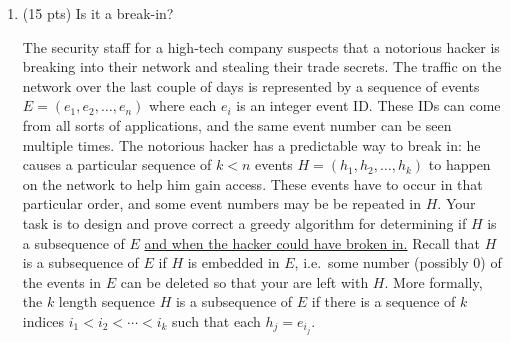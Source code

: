 \documentclass[11pt]{article}
\theoremstyle{definition}
\newtheorem*{algo}{Algorithm}
\newtheorem*{proofcorr}{Proof of correctness}
\newtheorem*{analysis}{Big-O Analysis}
\begin{document}
\begin{enumerate}
Each book $k$ has a popularity represented by the probability $p(k)$ of being wanted by a student (since these are probabilities they are non-negative and sum to 1). 
Unfortunately, the students are not sophisticated enough to do binary search, and so do a sequential search 
for the book from left to right.   When $s_1$ is the first book on shelf, $s_2$ the second, and so on, 
and some book $s_i$ is wanted, it will time $i$ for the student to locate it. 
When all the books are on the shelf, the average search time is $\sum_{i=1}^n i \cdot p(s_i)$.  
The problem is to find (and prove correct) a greedy algorithm that that takes the $p(k)$ values and 
determines an order $s_1, s_2, \ldots , s_n$ for storing the books on the shelf that minimizes this average search time.

(Hint: Use the structure of the problem or an exchange argument to prove your greedy algorithm's solution is optimal.)

\textit{Continued on next page.}
\newpage
\begin{algo}


\end{algo}
\newpage
\begin{proofcorr}

\end{proofcorr}
\newpage
\begin{analysis}

\end{analysis}
\newpage

\emph{I have read and agree to the collaboration policy.}  -- Isai Lopez, ilopezro@ucsc.edu
\\
Collaborators: None %
\\
\hrule
\item (15 pts)  Is it a break-in?

The security staff for a high-tech company suspects that a notorious hacker is breaking into their network and stealing their trade secrets.   
The traffic on the network over the last couple of days is represented by a sequence of 
events $E=(e_1, e_2, \ldots, e_n)$
where each $e_i$ is an integer event ID.  
These IDs can come from all sorts of applications, and the same event number can be seen multiple times.
The notorious hacker has a predictable way to break in:  he causes a particular 
sequence of $k<n$ events $H=(h_1, h_2, \ldots, h_k)$ to happen on the network to help him gain access.
These events have to occur in that particular order, and some event numbers may be be repeated in $H$.
Your task is to design and prove correct a greedy algorithm for determining if $H$ is a subsequence of $E$
\uline{and when the hacker could have broken in.}
Recall that $H$ is a subsequence of $E$ if $H$ is embedded in $E$, i.e.~some number (possibly 0) of the events in $E$ can be deleted so that your are left with $H$.  
More formally, the $k$ length sequence $H$ is a subsequence of $E$ if there is a sequence of $k$ indices 
$i_1 < i_2 < \cdots < i_k$ such that each $h_j = e_{i_j}$.


\end{enumerate}
\end{document}
